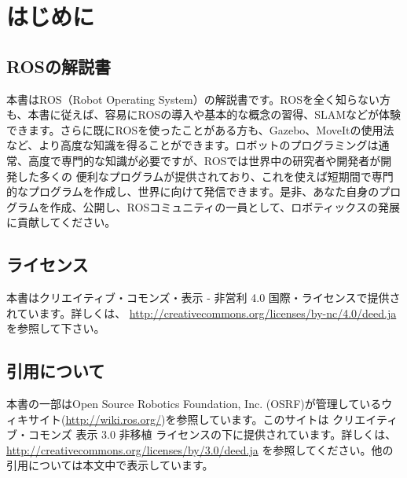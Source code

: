 \chapter*{はじめに}

\section*{ROSの解説書}

本書はROS（Robot Operating System）の解説書です。ROSを全く知らない方も、本書に従えば、容易にROSの導入や基本的な概念の習得、SLAMなどが体験できます。さらに既にROSを使ったことがある方も、Gazebo、MoveItの使用法など、より高度な知識を得ることができます。ロボットのプログラミングは通常、高度で専門的な知識が必要ですが、ROSでは世界中の研究者や開発者が開発した多くの
便利なプログラムが提供されており、これを使えば短期間で専門的なプログラムを作成し、世界に向けて発信できます。是非、あなた自身のプログラムを作成、公開し、ROSコミュニティの一員として、ロボティックスの発展に貢献してください。

\section*{ライセンス}

本書はクリエイティブ・コモンズ・表示 - 非営利 4.0 国際・ライセンスで提供されています。詳しくは、 \url{http://creativecommons.org/licenses/by-nc/4.0/deed.ja} を参照して下さい。

\section*{引用について}

本書の一部はOpen Source Robotics Foundation, Inc. (OSRF)が管理しているウィキサイト(\url{http://wiki.ros.org/})を参照しています。このサイトは クリエイティブ・コモンズ 表示 3.0 非移植 ライセンスの下に提供されています。詳しくは、\url{http://creativecommons.org/licenses/by/3.0/deed.ja} を参照してください。他の引用については本文中で表示しています。

